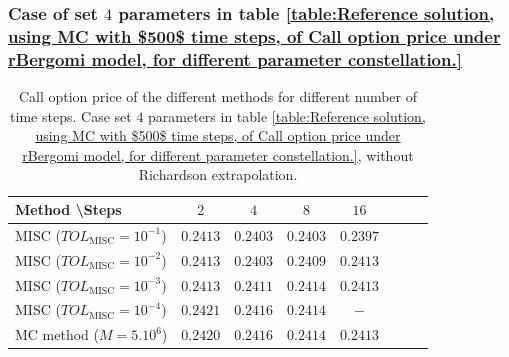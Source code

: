 \FloatBarrier
\subsubsection{Case of set $4$ parameters in table \ref{table:Reference solution, using MC with $500$ time steps, of Call option price under rBergomi model, for different parameter constellation.}}\label{sec:Case of set 4 parameters}
\FloatBarrier
\begin{table}[h!]
	\centering
	\begin{tabular}{l*{6}{c}r}
		Method \textbackslash  Steps            & $2$ & $4$ & $8$ & $16$ &   \\
		\hline
		MISC ($TOL_{\text{MISC}}=10^{-1}$)  & $0.2413$ &$0.2403$& $0.2403$ & $0.2397$   \\
		MISC ($TOL_{\text{MISC}}=10^{-2}$)  &$0.2413$ & $0.2403$ & $0.2409$ & $0.2413$  \\
		
		MISC ($TOL_{\text{MISC}}=10^{-3}$)  & $0.2413$ & $0.2411$ & $0.2414$ & $0.2413$  \\
		MISC ($TOL_{\text{MISC}}=10^{-4}$)  &  $0.2421$ & $0.2416$ & $0.2414$ & $-$  \\
		
		\hline
		MC method ($M=5.10^{6}$)   & $0.2420$ & $0.2416$  & $0.2414$ & $0.2413$ \\		
		
		\hline
	\end{tabular}
	\caption{ Call option price of the different methods for different number of time steps. Case set $4$ parameters in table \ref{table:Reference solution, using MC with $500$ time steps, of Call option price under rBergomi model, for different parameter constellation.}, without Richardson extrapolation.}
	\label{table: Call option price of the different methods for different number of time steps. Case set 4}
\end{table}
\FloatBarrier

